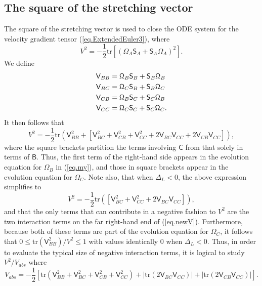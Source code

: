 \documentclass[preprint,amssymb,amsmath,aip,cha]{revtex4-1}
\begin{document}
\subsection{The square of the stretching vector}
The square of the stretching vector is used to close the ODE system for the velocity gradient tensor (\ref{eq.ExtendedEuler3}), where 
\begin{equation}
V^{2} = -\frac{1}{2}\mbox{tr}[(\mathsf{\Omega}_{A}\mathsf{S}_{A}+\mathsf{S}_{A}\mathsf{\Omega}_{A})^{2}].
\end{equation}
We define 
\begin{align}
\notag
\mathsf{V}_{BB} &= \mathsf{\Omega}_{B}\mathsf{S}_{B} + \mathsf{S}_{B}\mathsf{\Omega}_{B}\\
\notag
\mathsf{V}_{BC} &= \mathsf{\Omega}_{C}\mathsf{S}_{B} + \mathsf{S}_{B}\mathsf{\Omega}_{C} \\
\notag
\mathsf{V}_{CB} &= \mathsf{\Omega}_{B}\mathsf{S}_{C} + \mathsf{S}_{C}\mathsf{\Omega}_{B}\\
\mathsf{V}_{CC} &= \mathsf{\Omega}_{C}\mathsf{S}_{C} + \mathsf{S}_{C}\mathsf{\Omega}_{C}.
\label{eq.Vterms}
\end{align}
It then follows that
\begin{equation}
V^{2} = -\frac{1}{2}\mbox{tr}(\mathsf{V}_{BB}^{2} + [\mathsf{V}_{BC}^{2} + \mathsf{V}_{CB}^{2} + \mathsf{V}_{CC}^{2} + 2\mathsf{V}_{BC}\mathsf{V}_{CC} + 2\mathsf{V}_{CB}\mathsf{V}_{CC}]),
\label{eq.newV}
\end{equation}
where the square brackets partition the terms involving $\mathsf{C}$ from that solely in terms of $\mathsf{B}$. Thus, the first term of the right-hand side appears in the evolution equation for $\mathsf{\Omega}_{B}$ in (\ref{eq.my}), and those in square brackets appear in the evolution equation for $\mathsf{\Omega}_{C}$. Note also, that when $\Delta_{L} < 0$, the above expression simplifies to
\begin{equation}
V^{2} = -\frac{1}{2}\mbox{tr}( [\mathsf{V}_{BC}^{2} + \mathsf{V}_{CC}^{2} + 2\mathsf{V}_{BC}\mathsf{V}_{CC}]),
\label{eq.newV2}
\end{equation}
and that the only terms that can contribute in a negative fashion to $V^{2}$ are the two interaction terms on the far right-hand end of (\ref{eq.newV}). Furthermore, because both of these terms are part of the evolution equation for $\mathsf{\Omega}_{C}$, it follows that $0 \le \mbox{tr}(\mathsf{V}_{BB}^{2})/V^{2} \le 1$ with values identically 0 when $\Delta_{L} < 0$. Thus, in order to evaluate the typical size of negative interaction terms, it is logical to study $V^{2} / V_{abs}$ where 
\begin{equation}
V_{abs} = -\frac{1}{2}[\mbox{tr}(\mathsf{V}_{BB}^{2} + \mathsf{V}_{BC}^{2} + \mathsf{V}_{CB}^{2} + \mathsf{V}_{CC}^{2}) + |\mbox{tr}(2\mathsf{V}_{BC}\mathsf{V}_{CC})| +  |\mbox{tr}(2\mathsf{V}_{CB}\mathsf{V}_{CC})|].
\label{eq.Vabs}
\end{equation}
\end{document}
